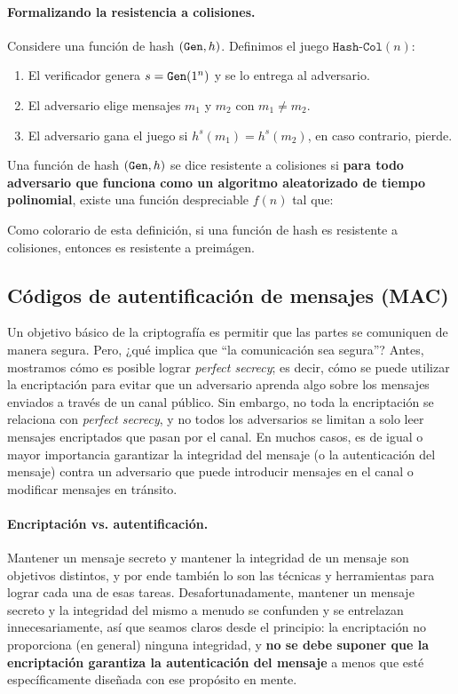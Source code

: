 \paragraph{Formalizando la resistencia a colisiones.} Considere una función de hash $(\texttt{Gen}, h)$. Definimos el juego $\texttt{Hash-Col}(n)$:
\begin{enumerate}
    \item El verificador genera $s = \texttt{Gen}(1^n)$ y se lo entrega al adversario.
    \item El adversario elige mensajes $m_1$ y $m_2$ con $m_1 \neq m_2$.
    \item El adversario gana el juego si $h^s(m_1) = h^s(m_2)$, en caso contrario, pierde.
\end{enumerate}

Una función de hash $(\texttt{Gen}, h)$ se dice resistente a colisiones si \textbf{para todo adversario que funciona como un algoritmo aleatorizado de tiempo polinomial}, existe una función despreciable $f(n)$ tal que:

Como colorario de esta definición, si una función de hash es resistente a colisiones, entonces es resistente a preimágen.

\subsection{Códigos de autentificación de mensajes (MAC)}

Un objetivo básico de la criptografía es permitir que las partes se comuniquen de manera segura. Pero, ¿qué implica que ``la comunicación sea segura''? Antes, mostramos cómo es posible lograr \textit{perfect secrecy}; es decir, cómo se puede utilizar la encriptación para evitar que un adversario aprenda algo sobre los mensajes enviados a través de un canal público. Sin embargo, no toda la encriptación se relaciona con \textit{perfect secrecy}, y no todos los adversarios se limitan a solo leer mensajes encriptados que pasan por el canal. En muchos casos, es de igual o mayor importancia garantizar la integridad del mensaje (o la autenticación del mensaje) contra un adversario que puede introducir mensajes en el canal o modificar mensajes en tránsito.

\paragraph{Encriptación vs. autentificación.} Mantener un mensaje secreto y mantener la integridad de un mensaje son objetivos distintos, y por ende también lo son las técnicas y herramientas para lograr cada una de esas tareas. Desafortunadamente, mantener un mensaje secreto y la integridad del mismo a menudo se confunden y se entrelazan innecesariamente, así que seamos claros desde el principio: la encriptación no proporciona (en general) ninguna integridad, y \textbf{no se debe suponer que la encriptación garantiza la autenticación del mensaje} a menos que esté específicamente diseñada con ese propósito en mente.

